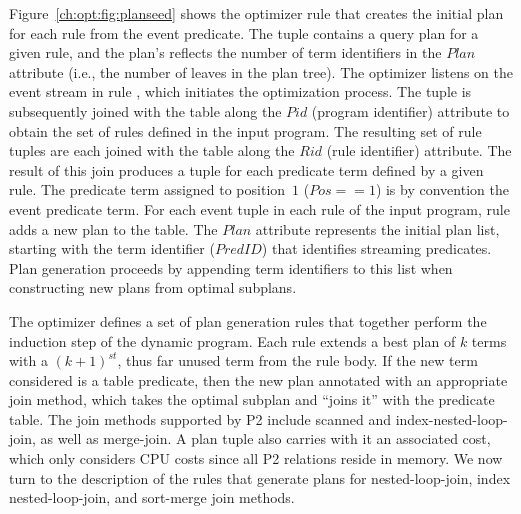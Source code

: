 Figure~\ref{ch:opt:fig:planseed} shows the optimizer rule that creates the
initial plan for each rule from the event predicate.  The  tuple
contains a query plan for a given rule, and the plan's  reflects the
number of term identifiers in the $Plan$ attribute (i.e., the number of leaves
in the plan tree).  The optimizer listens on the  event stream
in rule , which initiates the optimization process.  The
 tuple is subsequently joined with the  table along
the $Pid$ (program identifier) attribute to obtain the set of rules defined in
the input program.  The resulting set of rule tuples are each joined with the
 table along the $Rid$ (rule identifier) attribute.  The result
of this join produces a tuple for each predicate term defined by a given rule.
The predicate term assigned to position~$1$ ($Pos == 1$) is by convention the
event predicate term.  For each event  tuple in each rule of the
input program, rule  adds a new plan to the  table.  The
$Plan$ attribute represents the initial plan list, starting with the term
identifier ($PredID$) that identifies streaming predicates.  Plan generation
proceeds by appending term identifiers to this list when constructing new plans
from optimal subplans.

The \OVERLOG optimizer defines a set of plan generation rules that together
perform the induction step of the dynamic program.  Each rule extends a best
plan of $k$ terms with a $(k+1)^{st}$, thus far unused term from the rule body.
If the new term considered is a table predicate, then the new plan
annotated with an appropriate join method, which takes the optimal subplan and
``joins it'' with the predicate table.  The join methods supported by P2
include scanned and index-nested-loop-join, as well as merge-join.  A plan
tuple also carries with it an associated cost, which only considers CPU costs
since all P2 relations reside in memory.  We now turn to the description of the
rules that generate plans for nested-loop-join, index nested-loop-join, and
sort-merge join methods.

